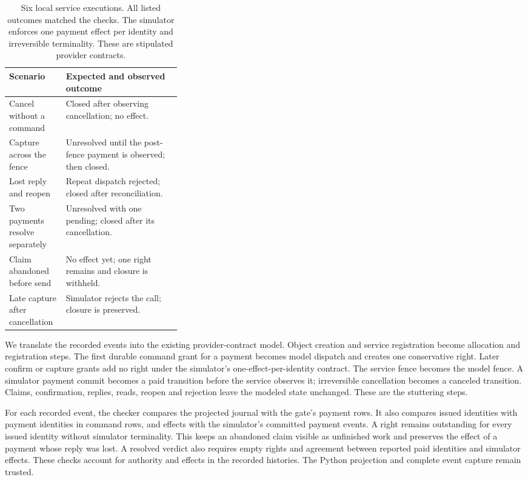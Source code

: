 \documentclass[letterpaper]{article}
\begin{document}
\begin{table}[ht]
\centering
\begin{tabularx}{\linewidth}{@{}p{0.33\linewidth} X@{}}
\toprule
Scenario & Expected and observed outcome \\
\midrule
Cancel without a command & Closed after observing cancellation; no effect. \\
Capture across the fence & Unresolved until the post-fence payment is observed; then closed. \\
Lost reply and reopen & Repeat dispatch rejected; closed after reconciliation. \\
Two payments resolve separately & Unresolved with one pending; closed after its cancellation. \\
Claim abandoned before send & No effect yet; one right remains and closure is withheld. \\
Late capture after cancellation & Simulator rejects the call; closure is preserved. \\
\bottomrule
\end{tabularx}
\caption{Six local service executions. All listed outcomes matched the checks.
The simulator enforces one payment effect per identity and irreversible
terminality. These are stipulated provider contracts.}
\label{tab:service_traces}
\end{table}

\begingroup{}
We translate the recorded events into the existing provider-contract model.
Object creation and service registration become allocation and registration
steps. The first durable command grant for a payment becomes model dispatch
and creates one conservative right. Later confirm or capture grants add no
right under the simulator's one-effect-per-identity contract. The service fence
becomes the model fence. A simulator payment commit becomes a paid transition
before the service observes it; irreversible cancellation becomes a canceled
transition. Claims, confirmation, replies, reads, reopen and rejection leave
the modeled state unchanged. These are the stuttering steps.\par
\endgroup

For each recorded event, the checker compares the projected journal with the
gate's payment rows. It also compares issued identities with payment identities
in command rows, and effects with the simulator's committed payment events.
A right remains outstanding for every issued identity without simulator
terminality. This keeps an abandoned claim visible as unfinished work and
preserves the effect of a payment whose reply was lost. A resolved verdict
also requires empty rights and agreement between reported paid identities and
simulator effects. These checks account for authority and effects in the
recorded histories. The Python projection and complete event capture remain
trusted.
\end{document}
